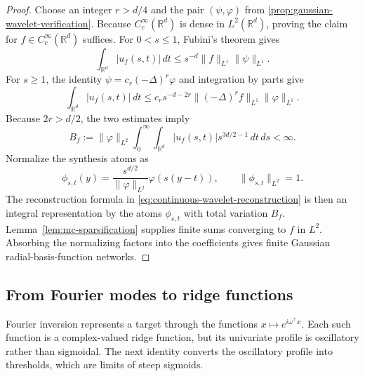 \documentclass[11pt,twoside]{article}
\newcommand{\R}{\mathbb R}
\theoremstyle{definition}
\theoremstyle{remark}
\begin{document}
\begin{proof}
Choose an integer $r>d/4$ and the pair $(\psi,\varphi)$ from
\cref{prop:gaussian-wavelet-verification}. Because
$C_c^\infty(\R^d)$ is dense in $L^2(\R^d)$, proving the claim for
$f\in C_c^\infty(\R^d)$ suffices.
For $0<s\leq1$, Fubini's theorem gives
\begin{equation}
 \int_{\R^d}|u_f(s,t)|\,dt
 \leq s^{-d}\|f\|_{L^1}\|\psi\|_{L^1}.
 \label{eq:wavelet-coarse-scale-bound}
\end{equation}
For $s\geq1$, the identity $\psi=c_r(-\Delta)^r\varphi$ and integration by
parts give
\begin{equation}
 \int_{\R^d}|u_f(s,t)|\,dt
 \leq c_rs^{-d-2r}\|(-\Delta)^rf\|_{L^1}\|\varphi\|_{L^1}.
 \label{eq:wavelet-fine-scale-bound}
\end{equation}
Because $2r>d/2$, the two estimates imply
\begin{equation}
 B_f:=\|\varphi\|_{L^2}
 \int_0^\infty\int_{\R^d}
 |u_f(s,t)|s^{3d/2-1}\,dt\,ds<\infty.
 \label{eq:wavelet-variation-norm}
\end{equation}
Normalize the synthesis atoms as
\[
 \phi_{s,t}(y)=
 \frac{s^{d/2}}{\|\varphi\|_{L^2}}\varphi(s(y-t)),
 \qquad \|\phi_{s,t}\|_{L^2}=1.
\]
The reconstruction formula in
\cref{eq:continuous-wavelet-reconstruction} is then an integral
representation by the atoms $\phi_{s,t}$ with total variation $B_f$.
Lemma~\ref{lem:mc-sparsification} supplies finite sums converging to $f$ in
$L^2$. Absorbing the normalizing factors into the coefficients gives finite
Gaussian radial-basis-function networks.
\end{proof}

\subsection{From Fourier modes to ridge functions}

Fourier inversion represents a target through the functions
$x\mapsto e^{i\omega^\top x}$. Each such function is a complex-valued ridge
function, but its univariate profile is oscillatory rather than sigmoidal.
The next identity converts the oscillatory profile into thresholds, which are
limits of steep sigmoids.
\end{document}
